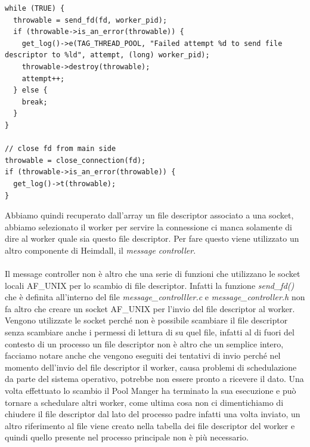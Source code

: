 \documentclass[italian]{tktltiki2}
\begin{document}
\begin{lstlisting}
while (TRUE) {
  throwable = send_fd(fd, worker_pid);
  if (throwable->is_an_error(throwable)) {
    get_log()->e(TAG_THREAD_POOL, "Failed attempt %d to send file descriptor to %ld", attempt, (long) worker_pid);
    throwable->destroy(throwable);
    attempt++;
  } else {
    break;
  }
}

// close fd from main side
throwable = close_connection(fd);
if (throwable->is_an_error(throwable)) {
  get_log()->t(throwable);
}
\end{lstlisting}
Abbiamo quindi recuperato dall'array un file descriptor associato a una socket, abbiamo selezionato il worker per servire la connessione ci manca solamente di dire al worker quale sia questo file descriptor. Per fare questo viene utilizzato un altro componente di Heimdall, il \emph{message controller}.\\
\\
Il message controller non è altro che una serie di funzioni che utilizzano le socket locali AF\_UNIX per lo scambio di file descriptor. Infatti la funzione \emph{send\_fd()} che è definita all'interno del file \emph{message\_controlller.c} e \emph{message\_controller.h} non fa altro che creare un socket AF\_UNIX per l'invio del file descriptor al worker. Vengono utilizzate le socket perché non è possibile scambiare il file descriptor senza scambiare anche i permessi di lettura di su quel file, infatti al di fuori del contesto di un processo un file descriptor non è altro che un semplice intero, facciamo notare anche che vengono eseguiti dei tentativi di invio perché nel momento dell'invio del file descriptor il worker, causa problemi di schedulazione da parte del sistema operativo, potrebbe non essere pronto a ricevere il dato. Una volta effettuato lo scambio il Pool Manger ha terminato la sua esecuzione e può tornare a schedulare altri worker, come ultima cosa non ci dimentichiamo di chiudere il file descriptor dal lato del processo padre infatti una volta inviato, un altro riferimento al file viene creato nella tabella dei file descriptor del worker e quindi quello presente nel processo principale non è più necessario.
\end{document}

